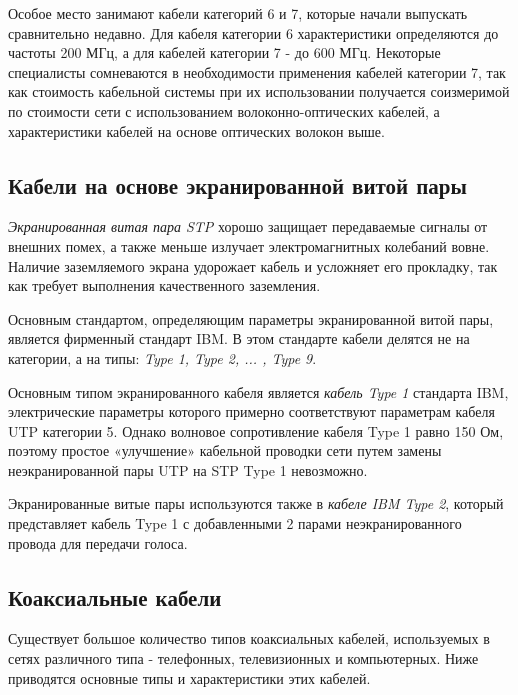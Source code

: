 Особое место занимают кабели категорий 6 и 7, которые начали выпускать сравнительно недавно.
Для кабеля категории 6 характеристики определяются до частоты 200 МГц, а для кабелей категории 7 - до 600 МГц.
Некоторые специалисты сомневаются в необходимости применения кабелей категории 7, так как стоимость кабельной системы при их использовании получается соизмеримой по стоимости сети с использованием волоконно-оптических кабелей, а характеристики кабелей на основе оптических волокон выше.

\subsection{Кабели на основе экранированной витой пары}

\emph{Экранированная витая пара STP} хорошо защищает передаваемые сигналы от внешних помех, а также меньше излучает электромагнитных колебаний вовне.
Наличие заземляемого экрана удорожает кабель и усложняет его прокладку, так как требует выполнения качественного заземления.

Основным стандартом, определяющим параметры экранированной витой пары, является фирменный стандарт IBM.
В этом стандарте кабели делятся не на категории, а на типы: \emph{Type 1, Type 2, ... , Type 9}.

Основным типом экранированного кабеля является \emph{кабель Type 1} стандарта IBM, электрические параметры которого примерно соответствуют параметрам кабеля UTP категории 5.
Однако волновое сопротивление кабеля Type 1 равно 150 Ом, поэтому простое «улучшение» кабельной проводки сети путем замены неэкранированной пары UTP на STP Type 1 невозможно.

Экранированные витые пары используются также в \emph{кабеле IBM Type 2}, который представляет кабель Type 1 с добавленными 2 парами неэкранированного провода для передачи голоса.

\subsection{Коаксиальные кабели}

Существует большое количество типов коаксиальных кабелей, используемых в сетях различного типа - телефонных, телевизионных и компьютерных.
Ниже приводятся основные типы и характеристики этих кабелей.

